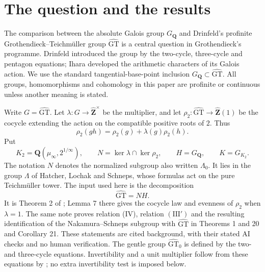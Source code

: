 \documentclass[11pt,a4paper]{article}
\theoremstyle{definition}
\theoremstyle{remark}
\newcommand{\GT}{\widehat{\mathrm{GT}}}
\newcommand{\GTz}{\widehat{\mathrm{GT}}_0}
\newcommand{\Zh}{\widehat{\mathbf Z}}
\newcommand{\Q}{\mathbf Q}
\newcommand{\GQ}{G_{\Q}}
\begin{document}
\begin{abstract}
The corrected adelic modular frames have exactly their joint Galois image. We determine its overlap with rational radicals, prove the normalized harmonic and cubic comparisons, and compute the exact joint odd CM image. At every odd coefficient prime, all arithmetic target characters survive the common kernel of the rational, single-prime, CM and finite-abelian-cover homology realizations; these realizations therefore do not provide the missing odd-prime lifts. We also construct explicit relative quadratic characters whose vanishing is undecided. The mathematics and text were produced by GPT-6 Astra Pro (ChatGPT Pro mode), with independent same-model re-proofs and targeted checks; no human has checked them.
\end{abstract}

\section{The question and the results}
The comparison between the absolute Galois group $\GQ$ and Drinfeld's profinite Grothendieck--Teichm\"uller group $\GT$ is a central question in Grothendieck's programme. Drinfeld introduced the group by the two-cycle, three-cycle and pentagon equations; Ihara developed the arithmetic characters of its Galois action. We use the standard tangential-base-point inclusion $\GQ\subset\GT$. All groups, homomorphisms and cohomology in this paper are profinite or continuous unless another meaning is stated.

Write $G=\GT$. Let $\lambda:G\to\Zh^\times$ be the multiplier, and let
$\rho_2:\GT\to\Zh(1)$ be the cocycle extending the action on the compatible positive roots of $2$. Thus
\[
 \rho_2(gh)=\rho_2(g)+\lambda(g)\rho_2(h).
\]
Put
\[
 K_2=\Q(\mu_\infty,2^{1/\infty}),\qquad
 N=\ker\lambda\cap\ker\rho_2,\qquad H=\GQ,\qquad K=G_{K_2}.
\]
The notation $N$ denotes the normalized subgroup also written $\Lambda_0$. It lies in the group $\Lambda$ of Hatcher, Lochak and Schneps, whose formulas act on the pure Teichm\"uller tower. The input used here is the decomposition
\begin{equation}\label{eq:decomposition}
 \GT=NH.
\end{equation}
It is Theorem 2 of \cite{H17}; Lemma 7 there gives the cocycle law and evenness of $\rho_2$ when $\lambda=1$. The same note proves relation (IV), relation $(\mathrm{III}')$ and the resulting identification of the Nakamura--Schneps subgroup with $\GT$ in Theorems 1 and 20 and Corollary 21. These statements are cited background, with their stated AI checks and no human verification. The gentle group $\GTz$ is defined by the two- and three-cycle equations. Invertibility and a unit multiplier follow from these equations by \cite[Theorems A and E]{Monoid}; no extra invertibility test is imposed below.
\end{document}
